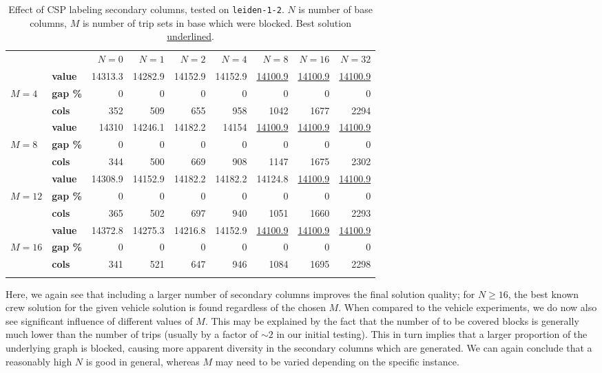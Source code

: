 \documentclass[]{article}
\begin{document}
\begin{table}[h]
  \centering
  \begin{tabular}{llrrrrrrr}
    \toprule
    && $N=0$ & $N=1$ & $N=2$ & $N=4$ & $N=8$ & $N=16$ & $N=32$  \\
    \arrayrulecolor{black!30}\cmidrule(lr){1-9}
    \addlinespace[0.4em]
     & \textbf{value}  & 14313.3 & 14282.9 & 14152.9 & 14152.9 & \underline{14100.9} & \underline{14100.9} & \underline{14100.9} \\
    $M=4$ & \textbf{gap \%}   & 0 & 0 & 0 & 0 & 0 & 0 & 0 \\
    & \textbf{cols} & 352 & 509 & 655 & 958 & 1042 & 1677 & 2294 \\
    \arrayrulecolor{black!30}\cmidrule(lr){1-9}
    & \textbf{value}  & 14310 & 14246.1 & 14182.2 & 14154 & \underline{14100.9} & \underline{14100.9} & \underline{14100.9} \\
    $M=8$ & \textbf{gap \%}   & 0 & 0 & 0 & 0 & 0 & 0 & 0 \\
    & \textbf{cols} & 344 & 500 & 669 & 908 & 1147 & 1675 & 2302 \\
    \arrayrulecolor{black!30}\cmidrule(lr){1-9}
    & \textbf{value}  & 14308.9 & 14152.9 & 14182.2 & 14182.2 & 14124.8 & \underline{14100.9} & \underline{14100.9} \\
    $M=12$ & \textbf{gap \%}   & 0 & 0 & 0 & 0 & 0 & 0 & 0 \\
    & \textbf{cols} & 365 & 502 & 697 & 940 & 1051 & 1660 & 2293 \\
    \arrayrulecolor{black!30}\cmidrule(lr){1-9}
    & \textbf{value}  & 14372.8 & 14275.3 & 14216.8 & 14152.9 & \underline{14100.9} & \underline{14100.9} & \underline{14100.9} \\
    $M=16$ & \textbf{gap \%}   & 0 & 0 & 0 & 0 & 0 & 0 & 0 \\
    & \textbf{cols} & 341 & 521 & 647 & 946 & 1084 & 1695 & 2298 \\
    \arrayrulecolor{black}\bottomrule
  \end{tabular}
  \caption{Effect of CSP labeling secondary columns, tested on \texttt{leiden-1-2}. $N$ is number of base columns, $M$ is number of trip sets in base which were blocked. Best solution \underline{underlined}.}
  \label{tab:csp-secondary-columns}
\end{table}

Here, we again see that including a larger number of secondary columns improves the final solution quality; for $N \geq 16$, the best known crew solution for the given vehicle solution is found regardless of the chosen $M$. When compared to the vehicle experiments, we do now also see significant influence of different values of $M$. This may be explained by the fact that the number of to be covered blocks is generally much lower than the number of trips (usually by a factor of $\sim2$ in our initial testing). This in turn implies that a larger proportion of the underlying graph is blocked, causing more apparent diversity in the secondary columns which are generated. We can again conclude that a reasonably high $N$ is good in general, whereas $M$ may need to be varied depending on the specific instance.
\end{document}
